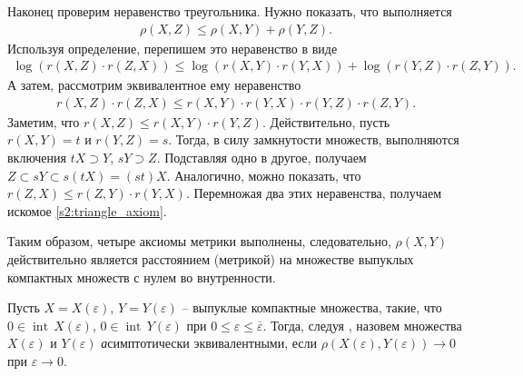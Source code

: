\documentclass[../main.tex]{subfiles}
\begin{document}
Наконец проверим неравенство треугольника. 
Нужно показать, что выполняется
\begin{gather*}
	\rho(X,Z) \leqslant \rho(X,Y) + \rho(Y,Z).
\end{gather*}
Используя определение, перепишем это неравенство в виде
\begin{gather*}
	\log(r(X,Z) \cdot r(Z,X)) \leqslant \log(r(X,Y) \cdot r(Y,X)) + \log(r(Y,Z) \cdot r(Z,Y)).
\end{gather*}
А затем, рассмотрим эквивалентное ему неравенство
\begin{gather}\label{s2:triangle_axiom}
	r(X,Z) \cdot r(Z,X) \leqslant r(X,Y) \cdot r(Y,X) \cdot r(Y,Z) \cdot r(Z,Y).
\end{gather}
Заметим, что $r(X,Z) \leqslant r(X,Y) \cdot r(Y,Z)$.
Действительно, пусть $ r(X,Y) = t $ и $r(Y,Z) = s$.
Тогда, в силу замкнутости множеств, выполняются включения $tX \supset Y$, $sY \supset Z$.
Подставляя одно в другое, получаем $Z \subset sY \subset s(tX) = (st) X$.
Аналогично, можно показать, что $r(Z,X) \leqslant r(Z,Y) \cdot r(Y,X)$. 
Перемножая два этих неравенства, получаем искомое \eqref{s2:triangle_axiom}.

Таким образом, четыре аксиомы метрики выполнены, следовательно, $\rho(X,Y)$ действительно является расстоянием (метрикой) на множестве выпуклых компактных множеств с нулем во внутренности.


Пусть $ X = X(\varepsilon) $,  $ Y = Y(\varepsilon) $ -- выпуклые компактные множества, такие, что $ 0 \in \operatorname{int}\,X(\varepsilon) $, $ 0 \in \operatorname{int}\,Y(\varepsilon) $ при $0 \leqslant \varepsilon \leqslant \overline{\varepsilon} $.
Тогда, следуя \cite{Ovs}, назовем множества $  X(\varepsilon)  $ и $  Y(\varepsilon) $ {\textit асимптотически эквивалентными}, если $  \rho (X(\varepsilon), Y(\varepsilon)) \rightarrow 0 $ при $\varepsilon \rightarrow 0 $.
\end{document}
